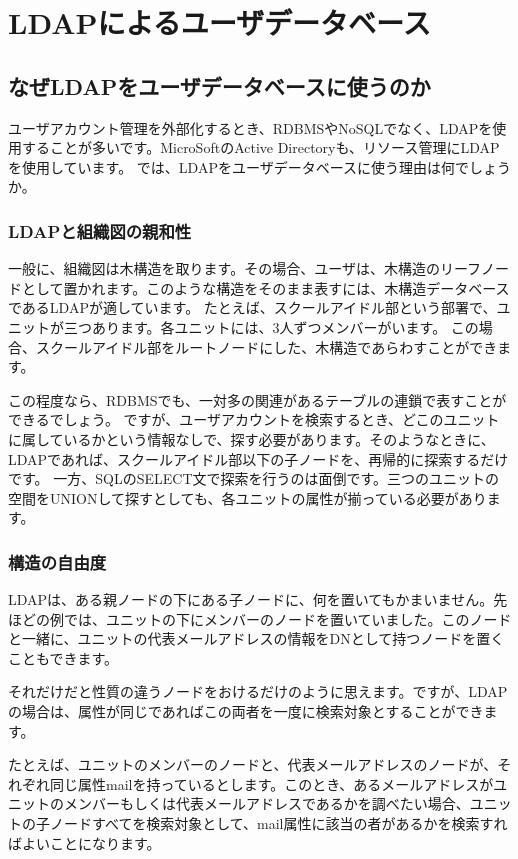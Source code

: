 \chapter{LDAPによるユーザデータベース}

\section{なぜLDAPをユーザデータベースに使うのか}

ユーザアカウント管理を外部化するとき、RDBMSやNoSQLでなく、LDAPを使用することが多いです。MicroSoftのActive Directoryも、リソース管理にLDAPを使用しています。
では、LDAPをユーザデータベースに使う理由は何でしょうか。

\subsection{LDAPと組織図の親和性}
一般に、組織図は木構造を取ります。その場合、ユーザは、木構造のリーフノードとして置かれます。このような構造をそのまま表すには、木構造データベースであるLDAPが適しています。
たとえば、スクールアイドル部という部署で、ユニットが三つあります。各ユニットには、3人ずつメンバーがいます。
この場合、スクールアイドル部をルートノードにした、木構造であらわすことができます。

この程度なら、RDBMSでも、一対多の関連があるテーブルの連鎖で表すことができるでしょう。
ですが、ユーザアカウントを検索するとき、どこのユニットに属しているかという情報なしで、探す必要があります。そのようなときに、LDAPであれば、スクールアイドル部以下の子ノードを、再帰的に探索するだけです。
一方、SQLのSELECT文で探索を行うのは面倒です。三つのユニットの空間をUNIONして探すとしても、各ユニットの属性が揃っている必要があります。

\subsection{構造の自由度}

LDAPは、ある親ノードの下にある子ノードに、何を置いてもかまいません。先ほどの例では、ユニットの下にメンバーのノードを置いていました。このノードと一緒に、ユニットの代表メールアドレスの情報をDNとして持つノードを置くこともできます。

それだけだと性質の違うノードをおけるだけのように思えます。ですが、LDAPの場合は、属性が同じであればこの両者を一度に検索対象とすることができます。

たとえば、ユニットのメンバーのノードと、代表メールアドレスのノードが、それぞれ同じ属性mailを持っているとします。このとき、あるメールアドレスがユニットのメンバーもしくは代表メールアドレスであるかを調べたい場合、ユニットの子ノードすべてを検索対象として、mail属性に該当の者があるかを検索すればよいことになります。


